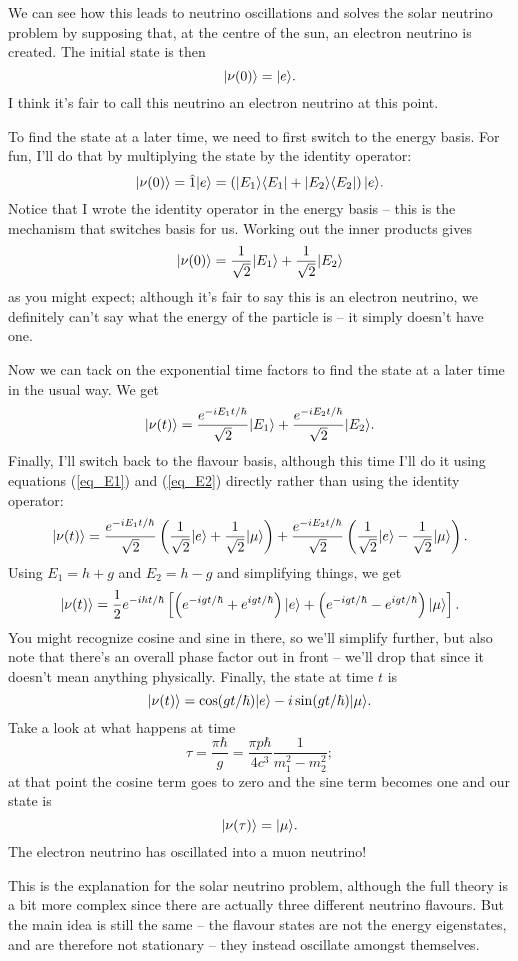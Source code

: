 We can see how this leads to neutrino oscillations and solves the solar neutrino problem by supposing that, at the centre of the sun, an electron neutrino is created.  The initial state is then
\begin{equation}
| \nu(0) \rangle = | e \rangle.
\end{equation}
I think it's fair to call this neutrino an electron neutrino at this point.

To find the state at a later time, we need to first switch to the energy basis.  For fun, I'll do that by multiplying the state by the identity operator:
\[
| \nu(0) \rangle = \hat{1} | e \rangle = \left( | E_1 \rangle\langle E_1 | + | E_2 \rangle \langle E_2 | \right) | e \rangle.
\]
Notice that I wrote the identity operator in the energy basis -- this is the mechanism that switches basis for us.  Working out the inner products gives
\begin{equation}
| \nu(0) \rangle =  \frac{1}{\sqrt{2}} | E_1 \rangle + \frac{1}{\sqrt{2}} | E_2 \rangle
\end{equation}
as you might expect; although it's fair to say this is an electron neutrino, we definitely can't say what the energy of the particle is -- it simply doesn't have one.

Now we can tack on the exponential time factors to find the state at a later time in the usual way.  We get
\[
| \nu(t) \rangle = \frac{e^{-iE_1 t / \hbar}}{\sqrt{2}} | E_1 \rangle + \frac{e^{-iE_2 t / \hbar}}{\sqrt{2}} | E_2 \rangle.
\]
Finally, I'll switch back to the flavour basis, although this time I'll do it using equations (\ref{eq_E1}) and (\ref{eq_E2}) directly rather than using the identity operator:
\[
| \nu(t) \rangle = \frac{e^{-iE_1 t / \hbar}}{\sqrt{2}} \left( \frac{1}{\sqrt{2}} | e \rangle + \frac{1}{\sqrt{2}} | \mu \rangle \right)  + \frac{e^{-iE_2 t / \hbar}}{\sqrt{2}} \left( \frac{1}{\sqrt{2}} | e \rangle - \frac{1}{\sqrt{2}} | \mu \rangle \right).
\]
Using $E_1 = h + g$ and $E_2 = h -g$ and simplifying things, we get
\[
| \nu(t) \rangle = \frac{1}{2} e^{-iht/\hbar} \left[  \left( e^{-igt/\hbar} + e^{igt/\hbar} \right) | e \rangle +  \left( e^{-igt/\hbar} - e^{igt/\hbar} \right) | \mu \rangle \right].
\]
You might recognize cosine and sine in there, so we'll simplify further, but also note that there's an overall phase factor out in front -- we'll drop that since it doesn't mean anything physically.  Finally, the state at time $t$ is
\begin{equation}
| \nu(t) \rangle = \cos (gt/\hbar) | e \rangle - i \sin(gt/\hbar) | \mu \rangle.
\end{equation}
Take a look at what happens at time
\[
\tau = \frac{\pi \hbar}{g} = \frac{\pi p \hbar}{4c^3} \frac{1}{m_1^2 - m_2^2};
\]
at that point the cosine term goes to zero and the sine term becomes one and our state is
\[
| \nu(\tau) \rangle = | \mu \rangle.
\]
The electron neutrino has oscillated into a muon neutrino!

This is the explanation for the solar neutrino problem, although the full theory is a bit more complex since there are actually three different neutrino flavours.  But the main idea is still the same -- the flavour states are not the energy eigenstates, and are therefore not stationary -- they instead oscillate amongst themselves.



%
%
%


